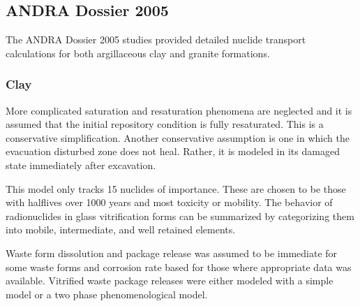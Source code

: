 \subsection{ANDRA Dossier 2005}
The ANDRA Dossier 2005 studies provided detailed nuclide transport 
calculations for both argillaceous clay and granite formations.

\subsubsection{Clay}
More complicated saturation and resaturation phenomena are neglected 
and it is assumed that the initial repository condition is fully 
resaturated. This is a conservative simplification. Another 
conservative assumption is one in which the evacuation disturbed zone 
does not heal. Rather, it is modeled in its damaged state immediately 
after excavation. 

This model only tracks 15 nuclides of importance.  These are chosen to 
be those with halflives over 1000 years and most toxicity or mobility.  
\cite{andra_argile:_2005} %
The behavior of radionuclides in glass vitrification forms can be 
summarized by categorizing them into mobile, intermediate, and well 
retained elements. %






Waste form dissolution and package release was assumed to be immediate 
for some waste forms and corrosion rate based for those where 
appropriate data was available. Vitrified waste package releases were 
either modeled with a simple model or a two phase phenomenological 
model. %

